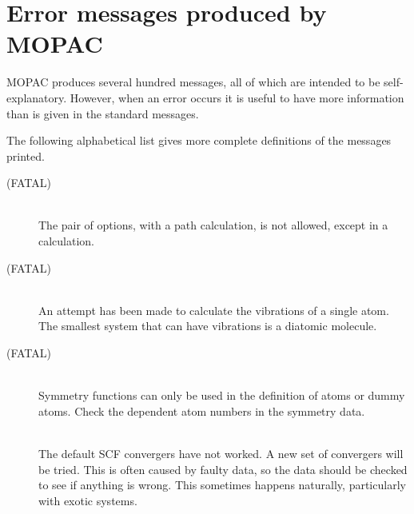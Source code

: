 \chapter{Error messages produced by MOPAC}\label{errormessages}
MOPAC produces several hundred messages, all of which are intended to be 
self-explanatory.  However, when an error occurs it is useful to have more
information than is given in the standard messages.

The following alphabetical list gives more complete definitions of the
messages printed.

\begin{description}
\item[ (FATAL)]~\\ 
The pair of options,  with a path calculation, is not allowed, except
in a  calculation.

\item[ (FATAL)]~\\
An attempt has been made to calculate the vibrations of a single atom.
The smallest system that can have vibrations is a diatomic molecule.

\item[ (FATAL)]~\\
Symmetry functions can only be used in the definition of atoms or dummy atoms.
Check the dependent atom numbers in the symmetry data.

\item[]~\\
The default SCF convergers have not worked.  A new set of convergers will be tried.
This is often caused by faulty data, so the data should be checked to see if
anything is wrong.  This sometimes happens naturally, particularly with exotic 
systems.


\end{description}
